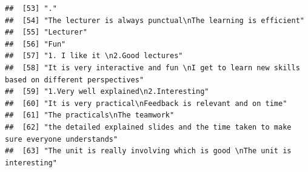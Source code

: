 \documentclass[
]{article}
\begin{document}
\begin{verbatim}
##  [53] "."                                                                                                                                                                                                                                                
##  [54] "The lecturer is always punctual\nThe learning is efficient"                                                                                                                                                                                       
##  [55] "Lecturer"                                                                                                                                                                                                                                         
##  [56] "Fun"                                                                                                                                                                                                                                              
##  [57] "1. I like it \n2.Good lectures"                                                                                                                                                                                                                   
##  [58] "It is very interactive and fun \nI get to learn new skills based on different perspectives"                                                                                                                                                       
##  [59] "1.Very well explained\n2.Interesting"                                                                                                                                                                                                             
##  [60] "It is very practical\nFeedback is relevant and on time"                                                                                                                                                                                           
##  [61] "The practicals\nThe teamwork"                                                                                                                                                                                                                     
##  [62] "the detailed explained slides and the time taken to make sure everyone understands"                                                                                                                                                               
##  [63] "The unit is really involving which is good \nThe unit is interesting"                                                                                                                                                                             

\end{verbatim}
\end{document}
